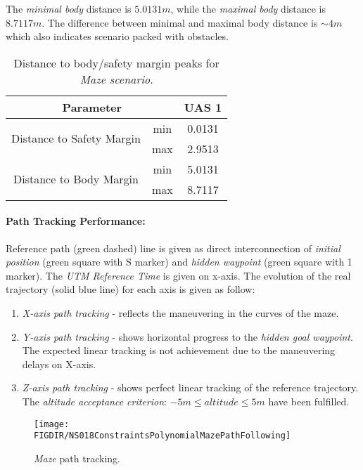 The \emph{minimal body} distance is $5.0131 m$, while the \emph{maximal body} distance is $8.7117 m$. The difference between minimal and maximal body distance is $\sim 4 m$ which also indicates scenario packed with obstacles. 

\begin{table}[H]
    \centering
    \begin{tabular}{c|c||c}
    \multicolumn{2}{c||}{Parameter} & UAS 1 \\\hline\hline
    \multirow{2}{*}{Distance to Safety Margin} & min & 0.0131 \\\cline{2-3}
                                            & max & 2.9513 \\\hline
    \multirow{2}{*}{Distance to Body Margin}   & min & 5.0131 \\\cline{2-3}
                                            & max & 8.7117 
    \end{tabular}
    \caption{Distance to body/safety margin peaks for \emph{Maze scenario}.}
    \label{tab:testCaseMazeSafetyAndBodyMarginDistances}
\end{table}

\paragraph{Path Tracking Performance:} Reference path (green dashed) line is given as direct interconnection of \emph{initial position} (green square with S marker) and \emph{hidden waypoint} (green square with 1 marker). The \emph{UTM Reference Time} is given on x-axis. The evolution of the real trajectory (solid blue line) for each axis is given as follow:

\begin{enumerate}
    \item \emph{X-axis path tracking} - reflects the maneuvering in the curves of the maze.
    
    \item \emph{Y-axis path tracking} - shows horizontal progress to the \emph{hidden goal waypoint}. The expected linear tracking is not achievement due to the maneuvering delays on X-axis.
    
    \item \emph{Z-axis path tracking} - shows perfect linear tracking of the reference trajectory. The \emph{altitude acceptance criterion}: $-5m \le altitude \le 5m$ have been fulfilled.
\end{enumerate}

\begin{figure}[H]
    \centering
    \texttt{[image: \\FIGDIR/NS018ConstraintsPolynomialMazePathFollowing]} 
    \caption{\emph{Maze} path tracking.}
    \label{fig:testCaseMazePathTracking}
\end{figure}


